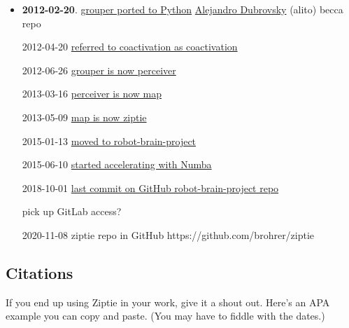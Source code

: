 \begin{itemize}
\item{\textbf{2012-02-20}.
\href{https://github.com/alito/becca/commit/6eea91447608a1a6280ce915a26a18a85a57ef1c#diff-2106149c513c2a9fb07b17281f3830e992856b0c553b348f398b5d0fc3f96bc1}
{grouper ported to Python}
\href{https://www.linkedin.com/in/alejandro-dubrovsky-90b9b833/}{Alejandro Dubrovsky} (alito)
becca repo
}

2012-04-20
\href{https://github.com/alito/becca/commit/dae6fa355c6bdcf9b5e2863d3b93dafa4fc4d5be#diff-2106149c513c2a9fb07b17281f3830e992856b0c553b348f398b5d0fc3f96bc1}
{referred to coactivation as coactivation}

2012-06-26
\href{https://github.com/alito/becca/commit/6e7f968f283e287917cbbc9520297b833ad5d3aa#diff-e521b0d7fc82aa487ff7542d8a2672c0074ee1ae38705a48676fbad625e39bed}
{grouper is now perceiver}

2013-03-16
\href{https://github.com/alito/becca/commit/dbb0374b164b6a5725b5bdf7d9eb208ddd82f855#diff-9338f7a12f369b96ae4414274afd08ce028c84758d252e683d937e6a56c48c9a}
{perceiver is now map}

2013-05-09
\href{https://github.com/alito/becca/blob/ba07dde43f5a24fb35c1eabcc756a2cdc799287d/src/scripts/agent/ziptie.py}
{map is now ziptie}

2015-01-13
\href{https://github.com/brohrer/robot-brain-project/blob/bc41b26373290acb6be0c9069be6ac6f3485b106/core/ziptie.py}
{moved to robot-brain-project}

2015-06-10
\href{https://github.com/brohrer/robot-brain-project/commit/3815c5a10cf256e9f61eeec1a34f3b60f55d107f#diff-f47908520ba430339ff71c0fb1052bc986dafdd875ad83c9083ed4687f469945}
{started accelerating with Numba}

2018-10-01
\href{https://github.com/brohrer/robot-brain-project/blob/53e2b52ab10e4ed7f92b3d488c49a6138d29a878/becca/ziptie.py}
{last commit on GitHub robot-brain-project repo}

pick up GitLab 
access?

2020-11-08
ziptie repo in GitHub
https://github.com/brohrer/ziptie

\end{itemize}

\subsection{Citations}
\label{subsec:citations}

If you end up using Ziptie in your work, give it a shout out.
Here's an APA example you can copy and paste. (You may have to fiddle with
the dates.)

